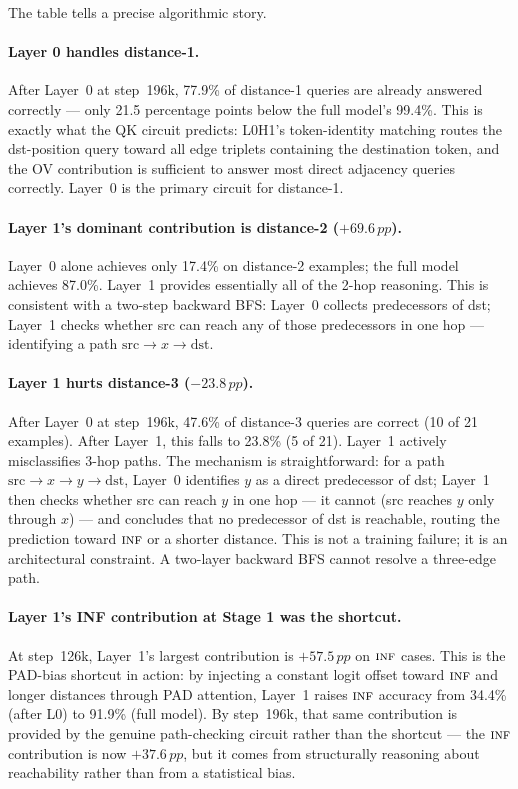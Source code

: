 \documentclass[11pt, a4paper]{article}
\newcommand{\INF}{\textsc{inf}}
\newcommand{\pp}{\,pp}  %
\begin{document}
The table tells a precise algorithmic story.

\paragraph{Layer 0 handles distance-1.}
After Layer~0 at step~196k, 77.9\% of distance-1 queries are already
answered correctly --- only 21.5 percentage points below the full
model's 99.4\%.  This is exactly what the QK circuit predicts: L0H1's
token-identity matching routes the dst-position query toward all edge
triplets containing the destination token, and the OV contribution is
sufficient to answer most direct adjacency queries correctly.  Layer~0
is the primary circuit for distance-1.

\paragraph{Layer 1's dominant contribution is distance-2 ($+69.6\pp$).}
Layer~0 alone achieves only 17.4\% on distance-2 examples; the full
model achieves 87.0\%.  Layer~1 provides essentially all of the 2-hop
reasoning.  This is consistent with a two-step backward BFS: Layer~0
collects predecessors of dst; Layer~1 checks whether src can reach any
of those predecessors in one hop --- identifying a path
$\mathrm{src} \to x \to \mathrm{dst}$.

\paragraph{Layer 1 hurts distance-3 ($-23.8\pp$).}
After Layer~0 at step~196k, 47.6\% of distance-3 queries are correct
(10 of 21 examples).  After Layer~1, this falls to 23.8\% (5 of 21).
Layer~1 actively misclassifies 3-hop paths.  The mechanism is
straightforward: for a path $\mathrm{src} \to x \to y \to \mathrm{dst}$,
Layer~0 identifies $y$ as a direct predecessor of dst; Layer~1 then
checks whether src can reach $y$ in one hop --- it cannot (src reaches
$y$ only through $x$) --- and concludes that no predecessor of dst is
reachable, routing the prediction toward $\INF$ or a shorter distance.
This is not a training failure; it is an architectural constraint.  A
two-layer backward BFS cannot resolve a three-edge path.

\paragraph{Layer 1's INF contribution at Stage 1 was the shortcut.}
At step~126k, Layer~1's largest contribution is $+57.5\pp$ on $\INF$
cases.  This is the PAD-bias shortcut in action: by injecting a
constant logit offset toward $\INF$ and longer distances through PAD
attention, Layer~1 raises $\INF$ accuracy from 34.4\% (after L0) to
91.9\% (full model).  By step~196k, that same contribution is provided
by the genuine path-checking circuit rather than the shortcut --- the
$\INF$ contribution is now $+37.6\pp$, but it comes from structurally
reasoning about reachability rather than from a statistical bias.
\end{document}
